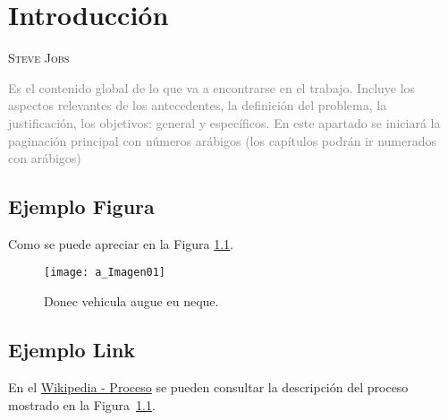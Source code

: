 \chapter{Introducción}
              {\textsc{Steve Jobs}}

\textcolor{gray}{Es el contenido global de lo que va a encontrarse en el trabajo. Incluye los aspectos relevantes de los antecedentes, la definición del problema, la justificación, los objetivos: general y específicos. En este apartado se iniciará la paginación principal con números arábigos (los capítulos podrán ir numerados con arábigos)}

\section{Ejemplo Figura}
\lipsum[1] 
Como se puede apreciar en la Figura \ref{fig:01_Proceso}.

\begin{figure}[htbp]                                                      %
\centering
\texttt{[image: a\_Imagen01]}
\caption{Donec vehicula augue eu neque.}
\label{fig:01_Proceso}
\end{figure}

\lipsum[2]


\section{Ejemplo Link}
\lipsum[3-4]
En el \href{https://es.wikipedia.org/wiki/Proceso_(ingenier%C3%ADa)}{Wikipedia - Proceso} se pueden consultar la descripción
del proceso mostrado en la Figura~\ref{fig:01_Proceso}. 
